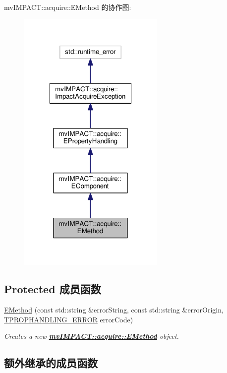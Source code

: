 mv\+I\+M\+P\+A\+C\+T\+:\+:acquire\+:\+:E\+Method 的协作图\+:
\nopagebreak
\begin{figure}[H]
\begin{center}
\leavevmode
\includegraphics[width=202pt]{classmv_i_m_p_a_c_t_1_1acquire_1_1_e_method__coll__graph}
\end{center}
\end{figure}
\subsection*{Protected 成员函数}
\begin{DoxyCompactItemize}
\item 
\hyperlink{classmv_i_m_p_a_c_t_1_1acquire_1_1_e_method_ac79b3957a44118c0ca6d67f859dfec9e}{E\+Method} (const std\+::string \&error\+String, const std\+::string \&error\+Origin, \hyperlink{group___common_interface_ga61b0634ab285d9a2a303e0092167127e}{T\+P\+R\+O\+P\+H\+A\+N\+D\+L\+I\+N\+G\+\_\+\+E\+R\+R\+O\+R} error\+Code)
\begin{DoxyCompactList}\small\item\em Creates a new {\bfseries \hyperlink{classmv_i_m_p_a_c_t_1_1acquire_1_1_e_method}{mv\+I\+M\+P\+A\+C\+T\+::acquire\+::\+E\+Method}} object. \end{DoxyCompactList}\end{DoxyCompactItemize}
\subsection*{额外继承的成员函数}


